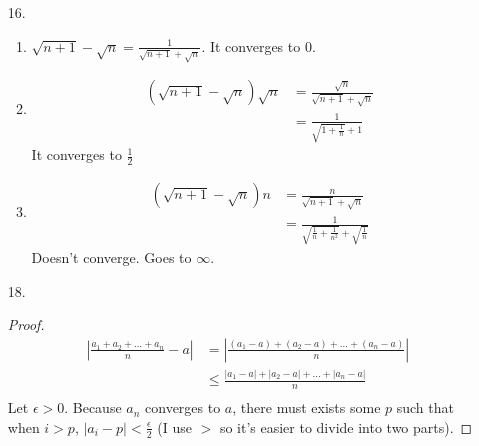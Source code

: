 \documentclass{article}
\begin{document}
\begin{itemize}
\begin{proof}
    \begin{equation*}
      \begin{split}
        \lim_{n\rightarrow \infty}a_n &= \lim_{n \rightarrow \infty} (1-\frac{1}{n+1})\\
        &= 1 - \lim_{n \rightarrow \infty}\frac{1}{n+1}\\
        &= 1 - 0\\
        &= 1
      \end{split}
    \end{equation*}
    As for why $\frac{1}{n+1}$ converges to $0$, that's because it is
a subsequence of $\frac{1}{n}$. I don't remember the theorem being
shown in class, but it can be easily proved with the definition of peak terms.
  \end{proof}
\item [16.]
  \begin{enumerate}[label=\alph*.]
  \item $\sqrt{n+1}-\sqrt{n} = \frac{1}{\sqrt{n+1}+\sqrt{n}}$. It
    converges to $0$.
  \item
    \begin{equation*}
      \begin{split}
        (\sqrt{n+1}-\sqrt{n})\sqrt{n} &=
        \frac{\sqrt{n}}{\sqrt{n+1}+\sqrt{n}}\\
        &= \frac{1}{\sqrt{1+\frac{1}{n}}+1}
      \end{split}
    \end{equation*}
    It converges to $\frac{1}{2}$
  \item
    \begin{equation*}
      \begin{split}
        (\sqrt{n+1}-\sqrt{n})n
        &= \frac{n}{\sqrt{n+1}+\sqrt{n}}\\
        &= \frac{1}{\sqrt{\frac{1}{n}+\frac{1}{n^2}} + \sqrt{\frac{1}{n}}}
      \end{split}
    \end{equation*}
    Doesn't converge. Goes to $\infty$.
  \end{enumerate}
\item [18.]
  \begin{proof}
    \begin{equation*}
    \begin{split}
      |\frac{a_1+a_2+\ldots + a_n}{n} - a|
      &= |\frac{(a_1-a)+(a_2-a)+\ldots+(a_n-a)}{n}|\\
      & \leq \frac{|a_1-a|+|a_2-a|+\ldots +|a_n-a|}{n}\\
    \end{split}
  \end{equation*}
  Let $\epsilon > 0$.
  Because $a_n$ converges to $a$, there must exists some $p$ such that when $i > p$, $|a_i - p| < \frac{\epsilon}{2}$ (I use $>$ so it's easier to divide into two parts).


\end{proof}
\end{itemize}
\end{document}
